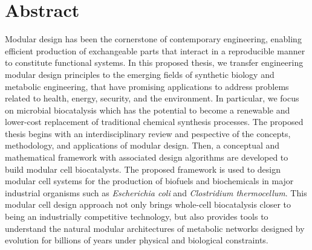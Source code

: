 \chapter*{Abstract}\label{ch:abstract}
Modular design has been the cornerstone of contemporary engineering, enabling efficient production of exchangeable parts that interact in a reproducible manner to constitute functional systems.
    In this proposed thesis, we transfer engineering modular design principles to the emerging fields of synthetic biology and metabolic engineering, that have promising applications to address problems related to health, energy, security, and the environment. In particular, we focus on microbial biocatalysis which has the potential to become a renewable and lower-cost replacement of traditional chemical synthesis processes.
    The proposed thesis begins with an interdisciplinary review and pespective of the concepts, methodology, and applications of modular design.
    Then, a conceptual and mathematical framework with associated design algorithms are developed to build modular cell biocatalysts. The proposed framework is used to design modular cell systems for the production of biofuels and biochemicals in major industrial organisms such as \textit{Escherichia coli} and \textit{Clostridium thermocellum}. This modular cell design approach not only brings whole-cell biocatalysis closer to being an industrially competitive technology, but also provides tools to understand the natural modular architectures of metabolic networks designed by evolution for billions of years under physical and biological constraints.
